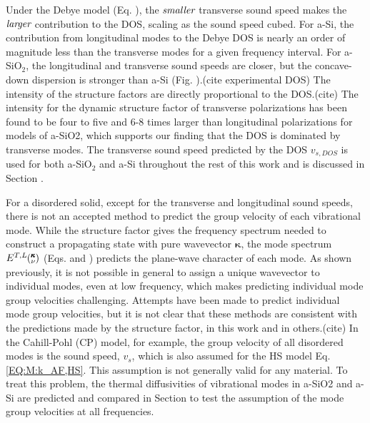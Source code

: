 \documentclass[aps,prb,onecolumn,preprint,superscriptaddress,footinbib,amsmath,amssymb,floatfix]{revtex4}
\newcommand{\kv}{\mspace{-4.0mu}\left(\mspace{-8.0mu}
\begin{smallmatrix}&\pmb{\kappa} \\&\nu\end{smallmatrix}
\mspace{-3.0mu}\right)}
\begin{document}
Under the Debye model (Eq. ), the $\emph{smaller}$ transverse sound speed 
makes the $\emph{larger}$ contribution to the DOS, scaling as the sound 
speed cubed. For a-Si, 
the contribution from longitudinal modes to the Debye DOS is nearly 
an order of magnitude less than the transverse modes for a given 
frequency interval. For a-SiO$_2$, the longitudinal and transverse 
sound speeds are closer, but the concave-down dispersion 
is stronger than a-Si (Fig. ).(cite experimental DOS) 
The intensity of the structure factors  
are directly proportional to the DOS.(cite)
The intensity for the dynamic structure factor of transverse 
polarizations has been found to be four to five\cite{taraskin_phonons_1997} 
and 6-8\cite{horbach_high_2001} times larger than longitudinal 
polarizations for models 
of a-SiO2, which supports our finding that the DOS is dominated 
by transverse modes. 
The transverse sound speed predicted by the DOS $v_{s,DOS}$ is used for both 
a-SiO$_2$ and a-Si throughout the rest of this work and is discussed 
in Section .

For a disordered solid, 
except for the transverse and longitudinal sound speeds, there is not an 
accepted method to predict the group velocity of each  
vibrational mode. 
While the structure factor gives the frequency spectrum needed to 
construct a propagating state with pure wavevector $\pmb{\kappa}$, 
the mode spectrum $E^{T,L}\kv$ (Eqs. and ) predicts the plane-wave 
character of each mode. As shown previously, it is not possible 
in general 
to assign a unique wavevector to individual modes, even at low frequency,
\cite{biswas_vibrational_1988,feldman_thermal_1993,silbert_normal_2009} 
which makes predicting individual mode group velocities challenging. 
Attempts have been made to predict individual mode group velocities,
\cite{cahill_lattice_1988,duda_reducing_2011,donadio_atomistic_2009,
he_heat_2011,he_thermal_2011,hori_phonon_2013} 
but 
it is not clear that these methods are consistent with the predictions 
made by the structure factor, in this work and in others.(cite) 
In the Cahill-Pohl (CP) model, for example, the group velocity of 
all disordered modes is the sound speed, $v_s$, which is also assumed  
for the HS model Eq. \eqref{EQ:M:k_AF,HS}.
\cite{cahill_lattice_1988} This assumption is not generally valid  
for any material.\cite{feldman_numerical_1999,duda_reducing_2011,
donadio_atomistic_2009,he_heat_2011,he_thermal_2011,larkin_predicting_2013}
To treat this problem, the thermal diffusivities of 
vibrational modes in a-SiO2 and a-Si 
are predicted and compared in Section  to test the assumption of the 
mode group velocities at all frequencies. 
\end{document}
